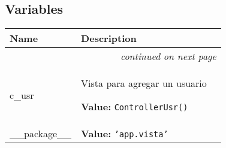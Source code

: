   \subsection{Variables}

    \vspace{-1cm}
\hspace{\varindent}\begin{longtable}{|p{\varnamewidth}|p{\vardescrwidth}|l}
\cline{1-2}
\cline{1-2} \centering \textbf{Name} & \centering \textbf{Description}& \\
\cline{1-2}
\endhead\cline{1-2}\multicolumn{3}{r}{\small\textit{continued on next page}}\\\endfoot\cline{1-2}
\endlastfoot\raggedright c\-\_\-u\-s\-r\- & \raggedright Vista para agregar un usuario

\textbf{Value:} 
{\tt ControllerUsr()}&\\
\cline{1-2}
\raggedright \_\-\_\-p\-a\-c\-k\-a\-g\-e\-\_\-\_\- & \raggedright \textbf{Value:} 
{\tt \texttt{'}\texttt{app.vista}\texttt{'}}&\\
\cline{1-2}
\end{longtable}

